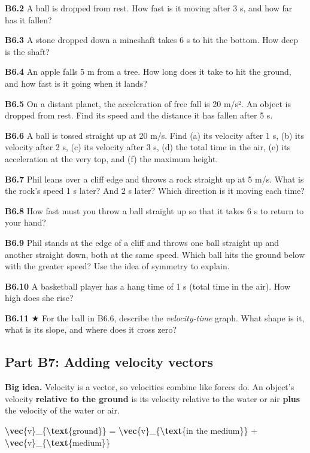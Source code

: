 \documentclass[
]{article}
\newenvironment{Shaded}{\begin{snugshade}}{\end{snugshade}}
\newcommand{\FunctionTok}[1]{\textcolor[rgb]{0.13,0.29,0.53}{\textbf{#1}}}
\newcommand{\NormalTok}[1]{#1}
\begin{document}
\textbf{B6.2} A ball is dropped from rest. How fast is it moving after 3
s, and how far has it fallen?

\textbf{B6.3} A stone dropped down a mineshaft takes 6 s to hit the
bottom. How deep is the shaft?

\textbf{B6.4} An apple falls 5 m from a tree. How long does it take to
hit the ground, and how fast is it going when it lands?

\textbf{B6.5} On a distant planet, the acceleration of free fall is 20
m/s². An object is dropped from rest. Find its speed and the distance it
has fallen after 5 s.

\textbf{B6.6} A ball is tossed straight up at 20 m/s. Find (a) its
velocity after 1 s, (b) its velocity after 2 s, (c) its velocity after 3
s, (d) the total time in the air, (e) its acceleration at the very top,
and (f) the maximum height.

\textbf{B6.7} Phil leans over a cliff edge and throws a rock straight up
at 5 m/s. What is the rock's speed 1 s later? And 2 s later? Which
direction is it moving each time?

\textbf{B6.8} How fast must you throw a ball straight up so that it
takes 6 s to return to your hand?

\textbf{B6.9} Phil stands at the edge of a cliff and throws one ball
straight up and another straight down, both at the same speed. Which
ball hits the ground below with the greater speed? Use the idea of
symmetry to explain.

\textbf{B6.10} A basketball player has a hang time of 1 s (total time in
the air). How high does she rise?

\textbf{B6.11} ★ For the ball in B6.6, describe the \emph{velocity-time}
graph. What shape is it, what is its slope, and where does it cross
zero?

\subsection{Part B7: Adding velocity
vectors}\label{part-b7-adding-velocity-vectors}

\textbf{Big idea.} Velocity is a vector, so velocities combine like
forces do. An object's velocity \textbf{relative to the ground} is its
velocity relative to the water or air \textbf{plus} the velocity of the
water or air.

\begin{Shaded}
\begin{Highlighting}[]
\FunctionTok{\textbackslash{}vec}\NormalTok{\{v\}\_\{}\FunctionTok{\textbackslash{}text}\NormalTok{\{ground\}\} = }\FunctionTok{\textbackslash{}vec}\NormalTok{\{v\}\_\{}\FunctionTok{\textbackslash{}text}\NormalTok{\{in the medium\}\} + }\FunctionTok{\textbackslash{}vec}\NormalTok{\{v\}\_\{}\FunctionTok{\textbackslash{}text}\NormalTok{\{medium\}\}}
\end{Highlighting}
\end{Shaded}
\end{document}
